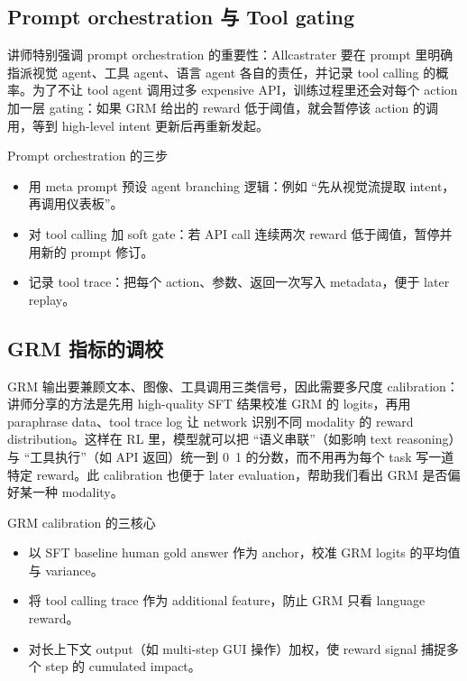 \documentclass[a4paper]{article}
\begin{document}
\subsection{Prompt orchestration 与 Tool gating}
讲师特别强调 prompt orchestration 的重要性：Allcastrater 要在 prompt 里明确指派视觉 agent、工具 agent、语言 agent 各自的责任，并记录 tool calling 的概率。为了不让 tool agent 调用过多 expensive API，训练过程里还会对每个 action 加一层 gating：如果 GRM 给出的 reward 低于阈值，就会暂停该 action 的调用，等到 high-level intent 更新后再重新发起。

\begin{knowledgebox}{Prompt orchestration 的三步}
\begin{itemize}
    \item 用 meta prompt 预设 agent branching 逻辑：例如 ``先从视觉流提取 intent，再调用仪表板''。
    \item 对 tool calling 加 soft gate：若 API call 连续两次 reward 低于阈值，暂停并用新的 prompt 修订。
    \item 记录 tool trace：把每个 action、参数、返回一次写入 metadata，便于 later replay。
\end{itemize}
\end{knowledgebox}

\subsection{GRM 指标的调校}
GRM 输出要兼顾文本、图像、工具调用三类信号，因此需要多尺度 calibration：讲师分享的方法是先用 high-quality SFT 结果校准 GRM 的 logits，再用 paraphrase data、tool trace log 让 network 识别不同 modality 的 reward distribution。这样在 RL 里，模型就可以把 ``语义串联''（如影响 text reasoning）与 ``工具执行''（如 API 返回）统一到 0~1 的分数，而不用再为每个 task 写一道特定 reward。此 calibration 也便于 later evaluation，帮助我们看出 GRM 是否偏好某一种 modality。

\begin{knowledgebox}{GRM calibration 的三核心}
\begin{itemize}
    \item 以 SFT baseline human gold answer 作为 anchor，校准 GRM logits 的平均值与 variance。
    \item 将 tool calling trace 作为 additional feature，防止 GRM 只看 language reward。
    \item 对长上下文 output（如 multi-step GUI 操作）加权，使 reward signal 捕捉多个 step 的 cumulated impact。
\end{itemize}
\end{knowledgebox}
\end{document}

